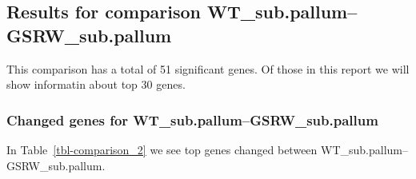 \documentclass[
  letterpaper,
  DIV=11,
  numbers=noendperiod]{scrartcl}
\begin{document}
\hypertarget{results-for-comparison-wt_sub.pallumgsrw_sub.pallum}{%
\subsection{Results for comparison
WT\_sub.pallum--GSRW\_sub.pallum}\label{results-for-comparison-wt_sub.pallumgsrw_sub.pallum}}

This comparison has a total of 51 significant genes. Of those in this
report we will show informatin about top 30 genes.

\hypertarget{changed-genes-for-wt_sub.pallumgsrw_sub.pallum}{%
\subsubsection{Changed genes for
WT\_sub.pallum--GSRW\_sub.pallum}\label{changed-genes-for-wt_sub.pallumgsrw_sub.pallum}}

In Table~\ref{tbl-comparison_2} we see top genes changed between
WT\_sub.pallum--GSRW\_sub.pallum.
\end{document}
